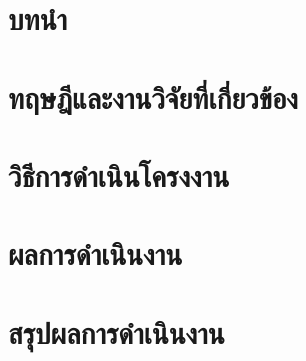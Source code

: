 \documentclass{cskkuproject}
\begin{document}
\maketitlepage

\setcounter{page}{0}
\renewcommand{\thepage}{\ThaiAlph{\value{page}}}

\begin{abstractTH}

\end{abstractTH}

\begin{abstractEN}

\end{abstractEN}

\begin{acknowledgement}

\end{acknowledgement}

\tableofcontents
\clearpage
\listoffigures
\clearpage
\listoftables
\clearpage

\setcounter{page}{1}

\chapter{บทนำ}


\chapter{ทฤษฎีและงานวิจัยที่เกี่ยวข้อง}


\chapter{วิธีการดำเนินโครงงาน}


\chapter{ผลการดำเนินงาน}


\chapter{สรุปผลการดำเนินงาน}

\end{document}
